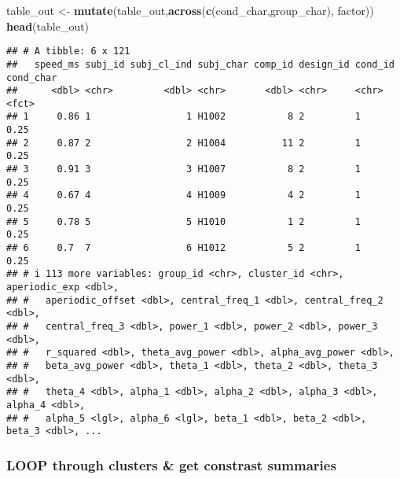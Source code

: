 \documentclass[
]{article}
\newenvironment{Shaded}{\begin{snugshade}}{\end{snugshade}}
\newcommand{\FunctionTok}[1]{\textcolor[rgb]{0.13,0.29,0.53}{\textbf{#1}}}
\newcommand{\NormalTok}[1]{#1}
\newcommand{\OtherTok}[1]{\textcolor[rgb]{0.56,0.35,0.01}{#1}}
\newcommand{\StringTok}[1]{\textcolor[rgb]{0.31,0.60,0.02}{#1}}
\begin{document}
\begin{Shaded}
\begin{Highlighting}[]
\NormalTok{table\_out }\OtherTok{\textless{}{-}} \FunctionTok{mutate}\NormalTok{(table\_out,}\FunctionTok{across}\NormalTok{(}\FunctionTok{c}\NormalTok{(}\StringTok{\textquotesingle{}cond\_char\textquotesingle{}}\NormalTok{,}\StringTok{\textquotesingle{}group\_char\textquotesingle{}}\NormalTok{), factor))}
\FunctionTok{head}\NormalTok{(table\_out)}
\end{Highlighting}
\end{Shaded}

\begin{verbatim}
## # A tibble: 6 x 121
##   speed_ms subj_id subj_cl_ind subj_char comp_id design_id cond_id cond_char
##      <dbl> <chr>         <dbl> <chr>       <dbl> <chr>     <chr>   <fct>    
## 1     0.86 1                 1 H1002           8 2         1       0.25     
## 2     0.87 2                 2 H1004          11 2         1       0.25     
## 3     0.91 3                 3 H1007           8 2         1       0.25     
## 4     0.67 4                 4 H1009           4 2         1       0.25     
## 5     0.78 5                 5 H1010           1 2         1       0.25     
## 6     0.7  7                 6 H1012           5 2         1       0.25     
## # i 113 more variables: group_id <chr>, cluster_id <chr>, aperiodic_exp <dbl>,
## #   aperiodic_offset <dbl>, central_freq_1 <dbl>, central_freq_2 <dbl>,
## #   central_freq_3 <dbl>, power_1 <dbl>, power_2 <dbl>, power_3 <dbl>,
## #   r_squared <dbl>, theta_avg_power <dbl>, alpha_avg_power <dbl>,
## #   beta_avg_power <dbl>, theta_1 <dbl>, theta_2 <dbl>, theta_3 <dbl>,
## #   theta_4 <dbl>, alpha_1 <dbl>, alpha_2 <dbl>, alpha_3 <dbl>, alpha_4 <dbl>,
## #   alpha_5 <lgl>, alpha_6 <lgl>, beta_1 <dbl>, beta_2 <dbl>, beta_3 <dbl>, ...
\end{verbatim}

\hypertarget{loop-through-clusters-get-constrast-summaries}{%
\subsubsection{LOOP through clusters \& get constrast
summaries}\label{loop-through-clusters-get-constrast-summaries}}
\end{document}
